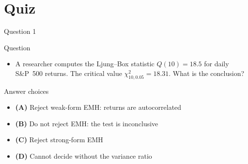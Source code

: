 \documentclass[9pt, aspectratio=169, t]{beamer}
\theoremstyle{definition}
\newenvironment{cminipage}[1]{%
    \par\noindent\hfill\begin{minipage}{#1}\ignorespaces
}{%
    \end{minipage}\hfill\null\par
}
\begin{document}
\section{Quiz}

\begin{frame}{Question 1}
    \begin{cminipage}{0.95\textwidth}
    \begin{alertblock}{Question}
        \begin{itemize}
            \item A researcher computes the Ljung--Box statistic $Q(10) = 18.5$ for daily S\&P~500 returns. The critical value $\chi^2_{10, 0.05} = 18.31$. What is the conclusion?
        \end{itemize}
    \end{alertblock}

    \vspace{0.3cm}

    \begin{block}{Answer choices}
        \begin{itemize}\setlength{\itemsep}{2pt}
        \item \textcolor{MainBlue}{\textbf{(A)}} Reject weak-form EMH: returns are autocorrelated
        \item \textcolor{MainBlue}{\textbf{(B)}} Do not reject EMH: the test is inconclusive
        \item \textcolor{MainBlue}{\textbf{(C)}} Reject strong-form EMH
        \item \textcolor{MainBlue}{\textbf{(D)}} Cannot decide without the variance ratio
        \end{itemize}
    \end{block}
    \end{cminipage}
\end{frame}
\end{document}
